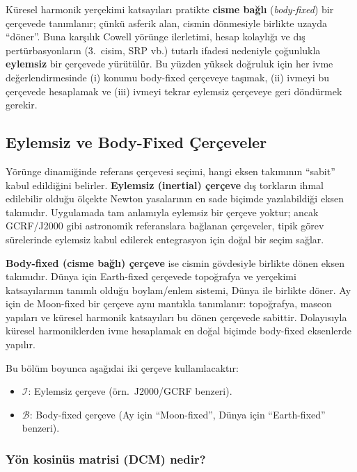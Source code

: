 Küresel harmonik yerçekimi katsayıları pratikte \textbf{cisme bağlı} (\emph{body-fixed}) bir çerçevede tanımlanır;
çünkü asferik alan, cismin dönmesiyle birlikte uzayda ``döner''. Buna karşılık Cowell yörünge ilerletimi,
hesap kolaylığı ve dış pertürbasyonların (3.\ cisim, SRP vb.) tutarlı ifadesi nedeniyle çoğunlukla \textbf{eylemsiz}
bir çerçevede yürütülür. Bu yüzden yüksek doğruluk için her ivme değerlendirmesinde (i) konumu body-fixed çerçeveye
taşımak, (ii) ivmeyi bu çerçevede hesaplamak ve (iii) ivmeyi tekrar eylemsiz çerçeveye geri döndürmek gerekir.

\subsection{Eylemsiz ve Body-Fixed Çerçeveler}
\label{subsec:inertial_bodyfixed}

Yörünge dinamiğinde referans çerçevesi seçimi, hangi eksen takımının ``sabit'' kabul edildiğini belirler.
\textbf{Eylemsiz (inertial) çerçeve} dış torkların ihmal edilebilir olduğu ölçekte Newton yasalarının en sade biçimde
yazılabildiği eksen takımıdır. Uygulamada tam anlamıyla eylemsiz bir çerçeve yoktur; ancak GCRF/J2000 gibi astronomik
referanslara bağlanan çerçeveler, tipik görev sürelerinde eylemsiz kabul edilerek entegrasyon için doğal bir seçim sağlar.

\medskip
\textbf{Body-fixed (cisme bağlı) çerçeve} ise cismin gövdesiyle birlikte dönen eksen takımıdır. Dünya için Earth-fixed
çerçevede topoğrafya ve yerçekimi katsayılarının tanımlı olduğu boylam/enlem sistemi, Dünya ile birlikte döner.
Ay için de Moon-fixed bir çerçeve aynı mantıkla tanımlanır: topoğrafya, mascon yapıları ve küresel harmonik katsayıları
bu dönen çerçevede sabittir. Dolayısıyla küresel harmoniklerden ivme hesaplamak en doğal biçimde body-fixed eksenlerde yapılır.

Bu bölüm boyunca aşağıdai iki çerçeve kullanılacaktır:
\begin{itemize}
\item $\mathcal I$: Eylemsiz çerçeve (örn.\ J2000/GCRF benzeri).
\item $\mathcal B$: Body-fixed çerçeve (Ay için ``Moon-fixed'', Dünya için ``Earth-fixed'' benzeri).
\end{itemize}

\subsubsection{Yön kosinüs matrisi (DCM) nedir?}
\label{subsubsec:dcm_intro}

